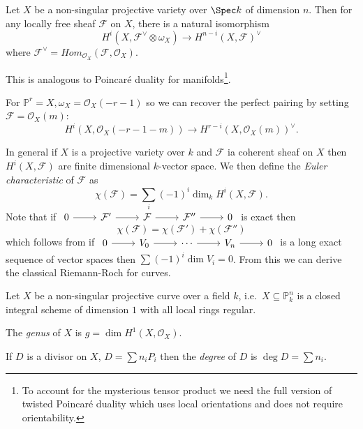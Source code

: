 \documentclass[a4paper]{article}
\renewcommand*{\P}{\mathbb{P}}
\newcommand{\sh}[1]{\mathcal{#1}} %
\begin{document}
\begin{theorem}
  Let \(X\) be a non-singular projective variety over \(\Spec k\) of dimension \(n\). Then for any locally free sheaf \(\sh F\) on \(X\), there is a natural isomorphism
  \[
    H^i(X, \sh F^\vee \otimes \omega_X) \to H^{n - i}(X, \sh F)^\vee
  \]
  where \(\sh F^\vee = Hom_{\sh O_X}(\sh F, \sh O_X)\).
\end{theorem}

This is analogous to Poincaré duality for manifolds\footnote{To account for the mysterious tensor product we need the full version of twisted Poincaré duality which uses local orientations and does not require orientability.}.

\begin{eg}
  For \(\P^r = X, \omega_X = \sh O_X(-r - 1)\) so we can recover the perfect pairing by setting \(\sh F = \sh O_X(m)\):
  \[
    H^i(X, \sh O_X(-r - 1 - m)) \to H^{r - i}(X, \sh O_X(m))^\vee.
  \]
\end{eg}

In general if \(X\) is a projective variety over \(k\) and \(\sh F\) ia coherent sheaf on \(X\) then \(H^i(X, \sh F)\) are finite dimensional \(k\)-vector space. We then define the \emph{Euler characteristic} of \(\sh F\) as
\[
  \chi(\sh F) = \sum_i (-1)^i \dim_k H^i(X, \sh F).
\]
Note that if \(
\begin{tikzcd}
  0 \ar[r] & \sh F' \ar[r] & \sh F \ar[r] & \sh F'' \ar[r] & 0
\end{tikzcd}
\) is exact then
\[
  \chi(\sh F) = \chi(\sh F') + \chi(\sh F'')
\]
which follows from if \(
\begin{tikzcd}
  0 \ar[r] & V_0 \ar[r] & \cdots \ar[r] & V_n \ar[r] & 0
\end{tikzcd}
\) is a long exact sequence of vector spaces then \(\sum (-1)^i \dim V_i = 0\). From this we can derive the classical Riemann-Roch for curves.

Let \(X\) be a non-singular projective curve over a field \(k\), i.e.\ \(X \subseteq \P^n_k\) is a closed integral scheme of dimension \(1\) with all local rings regular.

\begin{definition}[genus]
  The \emph{genus} of \(X\) is \(g = \dim H^1(X, \sh O_X)\).
\end{definition}

\begin{definition}[degree]
  If \(D\) is a divisor on \(X\), \(D = \sum n_iP_i\) then the \emph{degree} of \(D\) is \(\deg D = \sum n_i\).
\end{definition}
\end{document}
